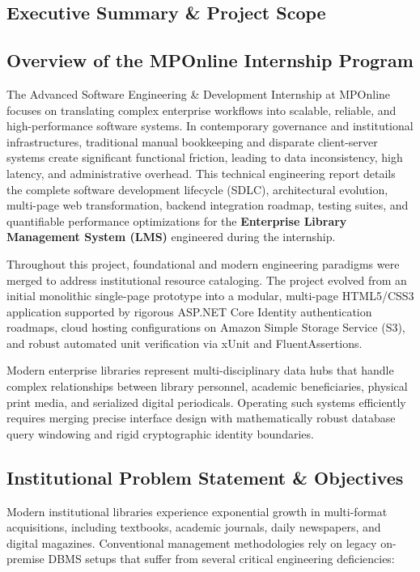 \documentclass[10pt,journal,compsoc]{IEEEtran}
\begin{document}
\subsection{Executive Summary \& Project Scope}

\subsection{Overview of the MPOnline Internship Program}
The Advanced Software Engineering \& Development Internship at MPOnline focuses on translating complex enterprise workflows into scalable, reliable, and high-performance software systems. In contemporary governance and institutional infrastructures, traditional manual bookkeeping and disparate client-server systems create significant functional friction, leading to data inconsistency, high latency, and administrative overhead. This technical engineering report details the complete software development lifecycle (SDLC), architectural evolution, multi-page web transformation, backend integration roadmap, testing suites, and quantifiable performance optimizations for the \textbf{Enterprise Library Management System (LMS)} engineered during the internship.

Throughout this project, foundational and modern engineering paradigms were merged to address institutional resource cataloging. The project evolved from an initial monolithic single-page prototype into a modular, multi-page HTML5/CSS3 application supported by rigorous ASP.NET Core Identity authentication roadmaps, cloud hosting configurations on Amazon Simple Storage Service (S3), and robust automated unit verification via xUnit and FluentAssertions.

Modern enterprise libraries represent multi-disciplinary data hubs that handle complex relationships between library personnel, academic beneficiaries, physical print media, and serialized digital periodicals. Operating such systems efficiently requires merging precise interface design with mathematically robust database query windowing and rigid cryptographic identity boundaries.

\subsection{Institutional Problem Statement \& Objectives}
Modern institutional libraries experience exponential growth in multi-format acquisitions, including textbooks, academic journals, daily newspapers, and digital magazines. Conventional management methodologies rely on legacy on-premise DBMS setups that suffer from several critical engineering deficiencies:
\end{document}
